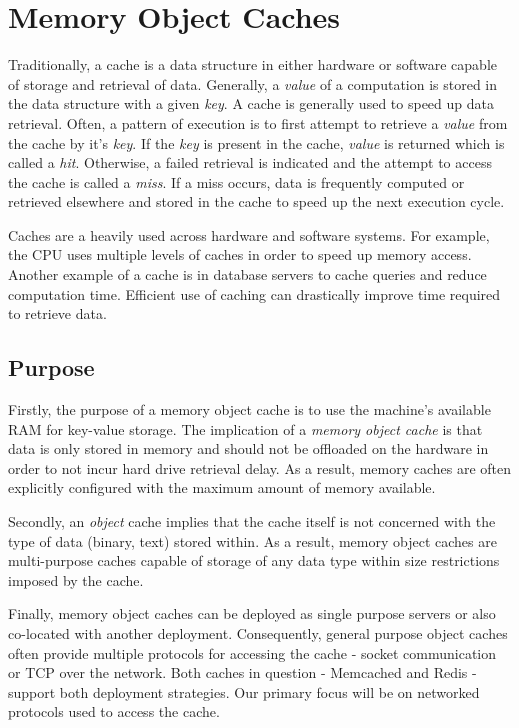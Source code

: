 \section{Memory Object Caches}

Traditionally, a cache is a data structure in either hardware or software capable of storage and retrieval of data. Generally, a \textit{value} of a computation is stored in the data structure with a given \textit{key}. A cache is generally used to speed up data retrieval. Often, a pattern of execution is to first attempt to retrieve a \textit{value} from the cache by it's \textit{key}. If the \textit{key} is present in the cache, \textit{value} is returned which is called a \textit{hit}. Otherwise, a failed retrieval is indicated and the attempt to access the cache is called a \textit{miss}. If a miss occurs, data is frequently computed or retrieved elsewhere and stored in the cache to speed up the next execution cycle.

Caches are a heavily used across hardware and software systems. For example, the CPU uses multiple levels of caches in order to speed up memory access. Another example of a cache is in database servers to cache queries and reduce computation time. Efficient use of caching can drastically improve time required to retrieve data.


\subsection{Purpose}
Firstly, the purpose of a memory object cache is to use the machine's available RAM for key-value storage. The implication of a \textit{memory object cache} is that data is only stored in memory and should not be offloaded on the hardware in order to not incur hard drive retrieval delay. As a result, memory caches are often explicitly configured with the maximum amount of memory available.

Secondly, an \textit{object} cache implies that the cache itself is not concerned with the type of data (binary, text) stored within. As a result, memory object caches are multi-purpose caches capable of storage of any data type within size restrictions imposed by the cache.

Finally, memory object caches can be deployed as single purpose servers or also co-located with another deployment. Consequently, general purpose object caches often provide multiple protocols for accessing the cache - socket communication or TCP over the network. Both caches in question - Memcached and Redis - support both deployment strategies. Our primary focus will be on networked protocols used to access the cache.


